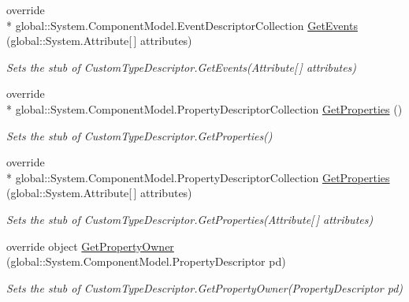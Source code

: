 \begin{DoxyCompactItemize}
override \\*
global\-::\-System.\-Component\-Model.\-Event\-Descriptor\-Collection \hyperlink{class_system_1_1_component_model_1_1_fakes_1_1_stub_custom_type_descriptor_a5b12f294c2a9653250f2a116ddece732}{Get\-Events} (global\-::\-System.\-Attribute\mbox{[}$\,$\mbox{]} attributes)
\begin{DoxyCompactList}\small\item\em Sets the stub of Custom\-Type\-Descriptor.\-Get\-Events(\-Attribute\mbox{[}$\,$\mbox{]} attributes)\end{DoxyCompactList}\item 
override \\*
global\-::\-System.\-Component\-Model.\-Property\-Descriptor\-Collection \hyperlink{class_system_1_1_component_model_1_1_fakes_1_1_stub_custom_type_descriptor_a6c1c2e4c6a73cfb00f572a240f16603d}{Get\-Properties} ()
\begin{DoxyCompactList}\small\item\em Sets the stub of Custom\-Type\-Descriptor.\-Get\-Properties()\end{DoxyCompactList}\item 
override \\*
global\-::\-System.\-Component\-Model.\-Property\-Descriptor\-Collection \hyperlink{class_system_1_1_component_model_1_1_fakes_1_1_stub_custom_type_descriptor_a8b1d7a1960888456fc2f5e81bbfc557a}{Get\-Properties} (global\-::\-System.\-Attribute\mbox{[}$\,$\mbox{]} attributes)
\begin{DoxyCompactList}\small\item\em Sets the stub of Custom\-Type\-Descriptor.\-Get\-Properties(\-Attribute\mbox{[}$\,$\mbox{]} attributes)\end{DoxyCompactList}\item 
override object \hyperlink{class_system_1_1_component_model_1_1_fakes_1_1_stub_custom_type_descriptor_af705d2ca1c7ef5a318b0d26caef0259b}{Get\-Property\-Owner} (global\-::\-System.\-Component\-Model.\-Property\-Descriptor pd)
\begin{DoxyCompactList}\small\item\em Sets the stub of Custom\-Type\-Descriptor.\-Get\-Property\-Owner(\-Property\-Descriptor pd)\end{DoxyCompactList}\end{DoxyCompactItemize}
